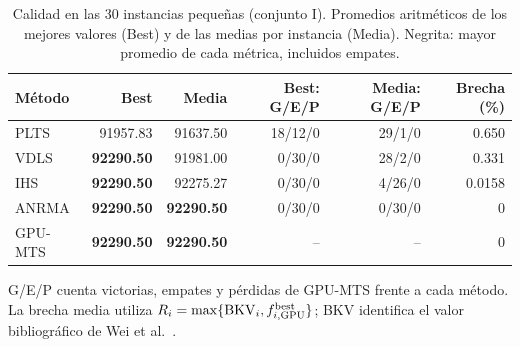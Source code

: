 \begin{table}[tbp]\centering\small
\caption{Calidad en las 30 instancias pequeñas (conjunto I). Promedios aritméticos de los mejores valores (Best) y de las medias por instancia (Media). Negrita: mayor promedio de cada métrica, incluidos empates.}
\label{tab:benchmark-small}
\begin{tabular}{lrrrrr}
\toprule
Método & Best & Media & Best: G/E/P & Media: G/E/P & Brecha (\%)\\
\midrule
PLTS & 91957.83 & 91637.50 & 18/12/0 & 29/1/0 & 0.650\\
VDLS & \textbf{92290.50} & 91981.00 & 0/30/0 & 28/2/0 & 0.331\\
IHS & \textbf{92290.50} & 92275.27 & 0/30/0 & 4/26/0 & 0.0158\\
ANRMA & \textbf{92290.50} & \textbf{92290.50} & 0/30/0 & 0/30/0 & 0\\
GPU-MTS & \textbf{92290.50} & \textbf{92290.50} & -- & -- & 0\\
\bottomrule\end{tabular}
\par\smallskip\parbox{.97\linewidth}{\footnotesize G/E/P cuenta victorias, empates y pérdidas de GPU-MTS frente a cada método. La brecha media utiliza $R_i=\max\{\mathrm{BKV}_i,f^{\mathrm{best}}_{i,\rm GPU}\}$; BKV identifica el valor bibliográfico de Wei et al.~\cite{Wei2026ANRMA}.}
\end{table}
